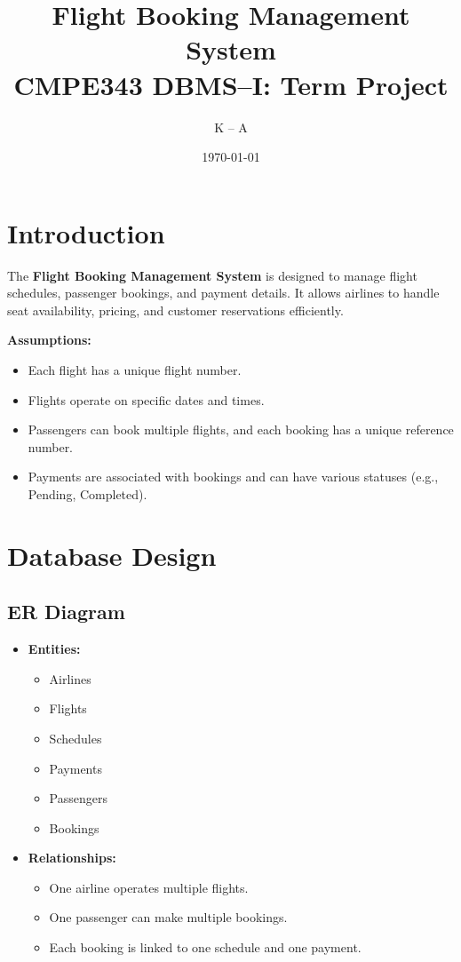 \documentclass[14pt,a4paper]{extarticle}
\title{\textbf{Flight Booking Management System}\\
       \large CMPE343 DBMS--I: Term Project}
\author{
    K -- A
}
\date{\today}
\begin{document}
\maketitle
\tableofcontents

\newpage

\section{Introduction}

The \textbf{Flight Booking Management System} is designed to manage flight schedules, passenger bookings, and payment details. It allows airlines to handle seat availability, pricing, and customer reservations efficiently.

\textbf{Assumptions:}
\begin{itemize}
    \item Each flight has a unique flight number.
    \item Flights operate on specific dates and times.
    \item Passengers can book multiple flights, and each booking has a unique reference number.
    \item Payments are associated with bookings and can have various statuses (e.g., Pending, Completed).
\end{itemize}

\newpage

\section{Database Design}

\subsection{ER Diagram}

\begin{itemize}
    \item \textbf{Entities:}
    \begin{itemize}
    \item Airlines
    \item Flights
    \item Schedules
    \item Payments
    \item Passengers
    \item Bookings
    \end{itemize}
    \item \textbf{Relationships:}
        \begin{itemize}
            \item One airline operates multiple flights.
            \item One passenger can make multiple bookings.
            \item Each booking is linked to one schedule and one payment.
        \end{itemize}
\end{itemize}
\end{document}
